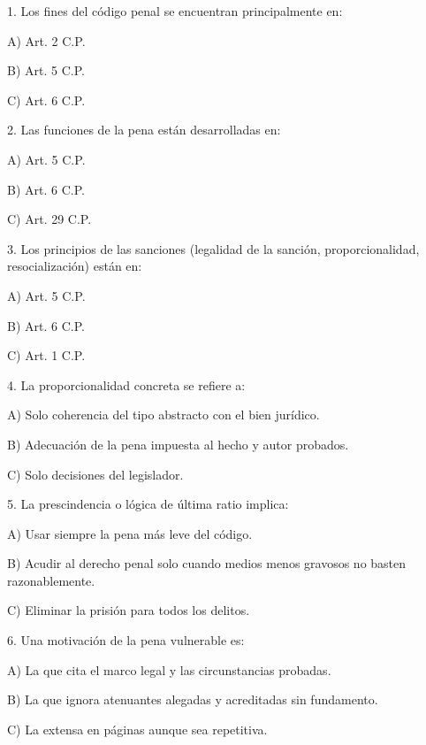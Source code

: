 \documentclass[11pt,a4paper]{article}
\begin{document}
      1. Los fines del código penal se encuentran principalmente en:\par

         A) Art. 2 C.P.\par
         B) Art. 5 C.P.\par
         C) Art. 6 C.P.\par


      2. Las funciones de la pena están desarrolladas en:\par

         A) Art. 5 C.P.\par
         B) Art. 6 C.P.\par
         C) Art. 29 C.P.\par


      3. Los principios de las sanciones (legalidad de la sanción, proporcionalidad, resocialización) están en:\par

         A) Art. 5 C.P.\par
         B) Art. 6 C.P.\par
         C) Art. 1 C.P.\par


      4. La proporcionalidad concreta se refiere a:\par

         A) Solo coherencia del tipo abstracto con el bien jurídico.\par
         B) Adecuación de la pena impuesta al hecho y autor probados.\par
         C) Solo decisiones del legislador.\par


      5. La prescindencia o lógica de última ratio implica:\par

         A) Usar siempre la pena más leve del código.\par
         B) Acudir al derecho penal solo cuando medios menos gravosos no basten razonablemente.\par
         C) Eliminar la prisión para todos los delitos.\par


      6. Una motivación de la pena vulnerable es:\par

         A) La que cita el marco legal y las circunstancias probadas.\par
         B) La que ignora atenuantes alegadas y acreditadas sin fundamento.\par
         C) La extensa en páginas aunque sea repetitiva.\par
\end{document}
